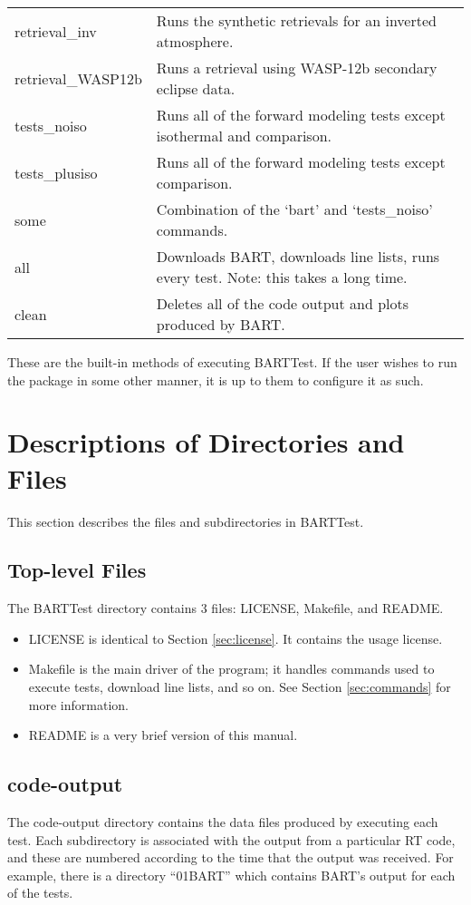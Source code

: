 \documentclass[letterpaper, 12pt]{article}
\begin{document}
\begin{table}[ht]
\begin{tabular}{ll}
retrieval{\_}inv & Runs the synthetic retrievals for an inverted atmosphere.\\
retrieval{\_}WASP12b & Runs a retrieval using WASP-12b secondary eclipse data.\\
tests{\_}noiso & Runs all of the forward modeling tests except isothermal and 
comparison.\\
tests{\_}plusiso & Runs all of the forward modeling tests except comparison.\\
some & Combination of the `bart' and `tests{\_}noiso' commands.\\
all & Downloads BART, downloads line lists, runs every test. Note: this 
takes a long time.\\
clean & Deletes all of the code output and plots produced by BART.\\
\hline
\end{tabular}
\end{table}

These are the built-in methods of executing BARTTest. If the user wishes to 
run the package in some other manner, it is up to them to configure it as such.

\section{Descriptions of Directories and Files}
\label{sec:files}

This section describes the files and subdirectories in BARTTest.

\subsection{Top-level Files}
The BARTTest directory contains 3 files: LICENSE, Makefile, and README.

\begin{itemize} \itemsep0pt
    \item LICENSE is identical to Section \ref{sec:license}. It contains the usage 
license.
    \item Makefile is the main driver of the program; it handles commands used 
to execute tests, download line lists, and so on. See Section 
\ref{sec:commands} for more information.
    \item README is a very brief version of this manual.
\end{itemize}

\subsection{code-output}
\label{sec:output}
The code-output directory contains the data files produced by executing 
each test. Each subdirectory is associated with the output from a particular 
RT code, and these are numbered according to the time that the output was 
received. For example, there is a directory ``01BART'' which contains BART's 
output for each of the tests.
\end{document}

